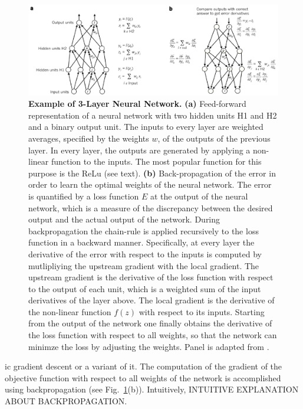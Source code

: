 \begin{figure}[h!]
	\centering
	\captionsetup{width=1\linewidth}
	\includegraphics[width=1\textwidth]{Figures/simple_neural_net.pdf}
	\caption{\textbf{Example of 3-Layer Neural Network.} \textbf{(a)} Feed-forward representation of a neural network with two hidden units H1 and H2 and a binary output unit. The inputs to every layer are weighted averages, specified by the weights $w$, of the outputs of the previous layer. In every layer, the outputs are generated by applying a non-linear function to the inputs. The most popular function for this purpose is the ReLu (see text). \textbf{(b)} Back-propagation of the error in order to learn the optimal weights of the neural network. The error is quantified by a loss function $E$ at the output of the neural network, which is a measure of the discrepancy between the desired output and the actual output of the network. During backpropagation the chain-rule is applied recursively to the loss function in a backward manner. Specifically, at every layer the derivative of the error with respect to the inputs is computed by mutlipliying the upstream gradient with the local gradient. The upstream gradient is the derivative of the loss function with respect to the output of each unit, which is a weighted sum of the input derivatives of the layer above. The local gradient is the derivative of the non-linear function $f(z)$ with respect to its inputs. Starting from the output of the network one finally obtains the derivative of the loss function with respect to all weights, so that the network can minimze the loss by adjusting the weights. Panel is adapted from \parencite{lecun2015}.}
	\label{fig:simple_neural_net}
\end{figure}

ic gradient descent \parencite{bottou2008} or a variant of it. The computation of the gradient of the objective function with respect to all weights of the network is accomplished using backpropagation \parencite{rumelhart1986} (see Fig.~\ref{fig:simple_neural_net}(b)).
Intuitively,  {INTUITIVE EXPLANATION ABOUT BACKPROPAGATION}.


